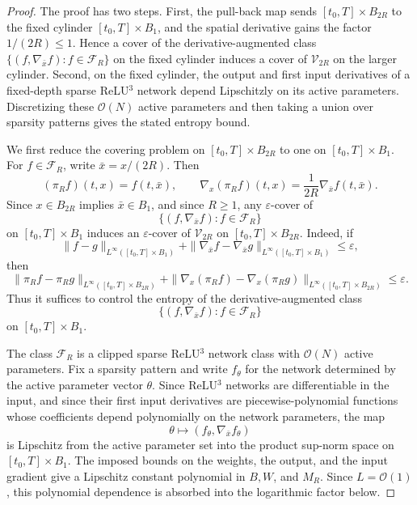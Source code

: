 \documentclass[11pt]{article}
\theoremstyle{plain}
\theoremstyle{definition}
\theoremstyle{remark}
\begin{document}
\begin{proof}
The proof has two steps. First, the pull-back map sends
\([t_0,T]\times B_{2R}\) to the fixed cylinder \([t_0,T]\times B_1\), and
the spatial derivative gains the factor \(1/(2R)\le1\). Hence a cover of
the derivative-augmented class
\(\{(f,\nabla_{\bar x}f):f\in\mathcal F_R\}\) on the fixed cylinder induces
a cover of \(\mathcal V_{2R}\) on the larger cylinder. Second, on the fixed
cylinder, the output and first input derivatives of a fixed-depth sparse
ReLU\(^3\) network depend Lipschitzly on its active parameters. Discretizing
these \(\mathcal O(N)\) active parameters and then taking a union over
sparsity patterns gives the stated entropy bound.

We first reduce the covering problem on \([t_0,T]\times B_{2R}\) to one on
\([t_0,T]\times B_1\). For \(f\in\mathcal F_R\), write
\(\bar x=x/(2R)\). Then
\[
(\pi_R f)(t,x)
=
f(t,\bar x),
\qquad
\nabla_x(\pi_R f)(t,x)
=
\frac1{2R}
\nabla_{\bar x}f(t,\bar x).
\]
Since \(x\in B_{2R}\) implies \(\bar x\in B_1\), and since \(R\ge1\), any
\(\varepsilon\)-cover of
\[
\{(f,\nabla_{\bar x}f):f\in\mathcal F_R\}
\]
on \([t_0,T]\times B_1\) induces an \(\varepsilon\)-cover of
\(\mathcal V_{2R}\) on \([t_0,T]\times B_{2R}\). Indeed, if
\[
\|f-g\|_{L^\infty([t_0,T]\times B_1)}
+
\|\nabla_{\bar x}f-\nabla_{\bar x}g\|_{L^\infty([t_0,T]\times B_1)}
\le \varepsilon,
\]
then
\[
\|\pi_R f-\pi_R g\|_{L^\infty([t_0,T]\times B_{2R})}
+
\|\nabla_x(\pi_R f)-\nabla_x(\pi_R g)\|_{L^\infty([t_0,T]\times B_{2R})}
\le
\varepsilon.
\]
Thus it suffices to control the entropy of the derivative-augmented class
\[
\{(f,\nabla_{\bar x}f):f\in\mathcal F_R\}
\]
on \([t_0,T]\times B_1\).

The class \(\mathcal F_R\) is a clipped sparse ReLU\(^3\) network class with
\(\mathcal O(N)\) active parameters. Fix a sparsity pattern and write
\(f_\theta\) for the network determined by the active parameter vector
\(\theta\). Since ReLU\(^3\) networks are differentiable in the input, and
since their first input derivatives are piecewise-polynomial functions whose
coefficients depend polynomially on the network parameters, the map
\[
\theta\mapsto (f_\theta,\nabla_{\bar x}f_\theta)
\]
is Lipschitz from the active parameter set into the product sup-norm space
on \([t_0,T]\times B_1\). The imposed bounds on the weights, the output, and
the input gradient give a Lipschitz constant polynomial in \(B,W\), and
\(M_R\). Since \(L=\mathcal O(1)\), this polynomial dependence is absorbed
into the logarithmic factor below.


\end{proof}
\end{document}
